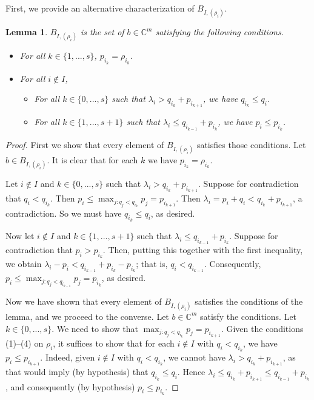 \documentclass[12pt,psamsfonts]{article}
\newtheorem{lemma}[theorem]{Lemma}
\begin{document}
\par First, we provide an alternative characterization of \(B_{I, (\rho_i)}\).
\begin{lemma}\label{alternative_bs_one}
    \(B_{I, (\rho_i)}\) is the set of \(b \in \mathbb{C}^m\) satisfying the following conditions.
    \begin{itemize}
        \item For all \(k \in \{1, ..., s\}\), \(p_{i_k} = \rho_{i_k}\).
        \item For all \(i \notin I\),
        \begin{itemize}
            \item For all \(k \in \{0, ..., s\}\) such that \(\lambda_i > q_{i_k} + p_{i_{k + 1}}\), we have \(q_{i_k} \leq q_i\).
            \item For all \(k \in \{1, ..., s + 1\}\) such that \(\lambda_i \leq q_{i_{k - 1}} + p_{i_k}\), we have \(p_i \leq p_{i_k}\).
        \end{itemize}
    \end{itemize}
\end{lemma}
\begin{proof}
    First we show that every element of \(B_{I, (\rho_i)}\) satisfies those conditions.
    Let \(b \in B_{I, (\rho_i)}\).
    It is clear that for each \(k\) we have \(p_{i_k} = \rho_{i_k}\).
    \par Let \(i \notin I\) and \(k \in \{0, ..., s\}\) such that \(\lambda_i > q_{i_k} + p_{i_{k + 1}}\).
    Suppose for contradiction that \(q_i < q_{i_k}\).
    Then \(p_i \leq \max_{j : q_j < q_{i_k}} p_j = p_{i_{k + 1}}\).
    Then \(\lambda_i = p_i + q_i < q_{i_k} + p_{i_{k + 1}}\), a contradiction.
    So we must have \(q_{i_k} \leq q_i\), as desired.
    \par Now let \(i \notin I\) and \(k \in \{1, ..., s + 1\}\) such that \(\lambda_i \leq q_{i_{k - 1}} + p_{i_k}\).
    Suppose for contradiction that \(p_i > p_{i_k}\).
    Then, putting this together with the first inequality, we obtain \(\lambda_i - p_i < q_{i_{k - 1}} + p_{i_k} - p_{i_k}\); that is, \(q_i < q_{i_{k - 1}}\).
    Consequently, \(p_i \leq \max_{j : q_j < q_{i_{k - 1}}} p_j = p_{i_k}\), as desired.
    \par Now we have shown that every element of \(B_{I, (\rho_i)}\) satisfies the conditions of the lemma, and we proceed to the converse.
    Let \(b \in \mathbb{C}^m\) satisfy the conditions.
    Let \(k \in \{0, ..., s\}\).
    We need to show that \(\max_{j : q_j < q_{i_k}} p_j = p_{i_{k + 1}}\).
    Given the conditions (1)--(4) on \(\rho_i\), it suffices to show that for each \(i \notin I\) with \(q_i < q_{i_k}\), we have \(p_i \leq p_{i_{k + 1}}\).
    Indeed, given \(i \notin I\) with \(q_i < q_{i_k}\), we cannot have \(\lambda_i > q_{i_k} + p_{i_{k + 1}}\), as that would imply (by hypothesis) that \(q_{i_k} \leq q_i\).
    Hence \(\lambda_i \leq q_{i_k} + p_{i_{k + 1}} \leq q_{i_{k - 1}} + p_{i_k}\), and consequently (by hypothesis) \(p_i \leq p_{i_k}\).
\end{proof}
\end{document}
